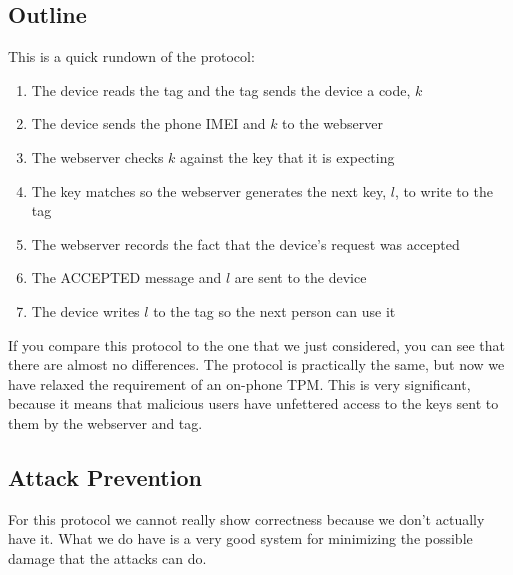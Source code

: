 \documentclass{sig-alternate}
\begin{document}
\subsection{Outline}
This is a quick rundown of the protocol:

\begin{enumerate}
\item The device reads the tag and the tag sends the device a code, $k$
\item The device sends the phone IMEI and $k$ to the webserver
\item The webserver checks $k$ against the key that it is expecting
\item The key matches so the webserver generates the next key, $l$, to write to the tag
\item The webserver records the fact that the device's request was accepted
\item The ACCEPTED message and $l$ are sent to the device 
\item The device writes $l$ to the tag so the next person can use it
\end{enumerate}

If you compare this protocol to the one that we just considered, you
can see that there are almost no differences. The protocol is
practically the same, but now we have relaxed the requirement of an
on-phone TPM. This is very significant, because it means that
malicious users have unfettered access to the keys sent to them
by the webserver and tag. 

\subsection{Attack Prevention}
For this protocol we cannot really show correctness because we don't
actually have it. What we do have is a very good system for minimizing
the possible damage that the attacks can do. 
\end{document}
